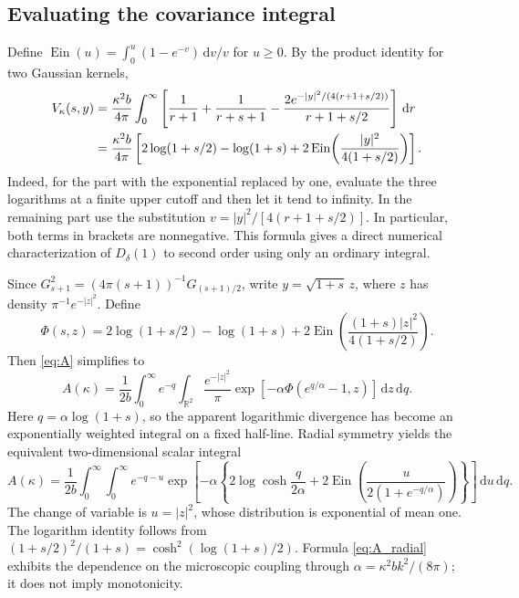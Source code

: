 \documentclass[11pt]{article}
\numberwithin{equation}{section}
\theoremstyle{definition}
\theoremstyle{remark}
\newcommand{\R}{\mathbb R}
\newcommand{\dd}{\,\mathrm d}
\newcommand{\Ein}{\operatorname{Ein}}
\begin{document}
\subsection{Evaluating the covariance integral}
Define $\Ein(u)=\int_0^u(1-e^{-v})\dd v/v$ for $u\ge0$. By the product identity for two Gaussian kernels,
\begin{align}
 V_\kappa(s,y)&=\frac{\kappa^2 b}{4\pi}\int_0^\infty
 \left[\frac1{r+1}+\frac1{r+s+1}
 -\frac{2e^{-|y|^2/(4(r+1+s/2))}}{r+1+s/2}\right]\dd r\notag\\
 &=\frac{\kappa^2b}{4\pi}\left[
 2\log(1+s/2)-\log(1+s)
 +2\Ein\!\left(\frac{|y|^2}{4(1+s/2)}\right)\right].\label{eq:V_explicit}
\end{align}
Indeed, for the part with the exponential replaced by one, evaluate the three logarithms at a finite upper cutoff and then let it tend to infinity. In the remaining part use the substitution $v=|y|^2/[4(r+1+s/2)]$. In particular, both terms in brackets are nonnegative. This formula gives a direct numerical characterization of $D_\delta(1)$ to second order using only an ordinary integral.

Since $G_{s+1}^2=(4\pi(s+1))^{-1}G_{(s+1)/2}$, write $y=\sqrt{1+s}\,z$, where $z$ has density $\pi^{-1}e^{-|z|^2}$. Define
\[
 \Phi(s,z)=2\log(1+s/2)-\log(1+s)+2\Ein\!\left(\frac{(1+s)|z|^2}{4(1+s/2)}\right).
\]
Then \eqref{eq:A} simplifies to
\begin{equation}\label{eq:A_reduced}
 \boxed{ A(\kappa)=\frac1{2b}\int_0^\infty e^{-q}
 \int_{\R^2}\frac{e^{-|z|^2}}{\pi}
 \exp[-\alpha\Phi(e^{q/\alpha}-1,z)]\dd z\dd q. }
\end{equation}
Here $q=\alpha\log(1+s)$, so the apparent logarithmic divergence has become an exponentially weighted integral on a fixed half-line. Radial symmetry yields the equivalent two-dimensional scalar integral
\begin{equation}\label{eq:A_radial}
 A(\kappa)=\frac1{2b}\int_0^\infty\int_0^\infty e^{-q-u}
 \exp\left[-\alpha\left\{2\log\cosh\frac{q}{2\alpha}
 +2\Ein\!\left(\frac{u}{2(1+e^{-q/\alpha})}\right)\right\}\right]\dd u\dd q.
\end{equation}
The change of variable is $u=|z|^2$, whose distribution is exponential of mean one. The logarithm identity follows from $(1+s/2)^2/(1+s)=\cosh^2(\log(1+s)/2)$. Formula \eqref{eq:A_radial} exhibits the dependence on the microscopic coupling through $\alpha=\kappa^2 b k^2/(8\pi)$; it does not imply monotonicity.
\end{document}
